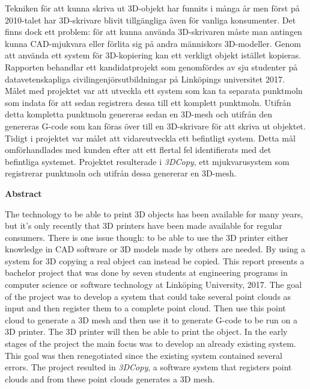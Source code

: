 \noindent
Tekniken för att kunna skriva ut 3D-objekt har funnits i många år men först på 2010-talet har 3D-skrivare blivit tillgängliga även för vanliga konsumenter. Det finns dock ett problem: för att kunna använda 3D-skrivaren måste man antingen kunna CAD-mjukvara eller förlita sig på andra människors 3D-modeller. Genom att använda ett system för 3D-kopiering kan ett verkligt objekt istället kopieras. Rapporten behandlar ett kandidatprojekt som genomfördes av sju studenter på datavetenskapliga civilingenjörsutbildningar på Linköpings universitet 2017. Målet med projektet var att utveckla ett system som kan ta separata punktmoln som indata för att sedan registrera dessa till ett komplett punktmoln. Utifrån detta kompletta punktmoln genereras sedan en 3D-mesh och utifrån den genereras G-code som kan föras över till en 3D-skrivare för att skriva ut objektet. Tidigt i projektet var målet att vidareutveckla ett befintligt system. Detta mål omförhandlades med kunden efter att ett flertal fel identifierats med det befintliga systemet. Projektet resulterade i \textit{3DCopy}, ett mjukvarusystem som registrerar punktmoln och utifrån dessa genererar en 3D-mesh.
\bigskip

\begin{center}
\textbf{Abstract}
\end{center}
\noindent

The technology to be able to print 3D objects has been available for many years, but it's only recently that 3D printers have been made available for regular consumers. There is one issue though: to be able to use the 3D printer either knowledge in CAD software or 3D models made by others are needed. By using a system for 3D copying a real object can instead be copied. This report presents a bachelor project that was done by seven students at engineering programs in computer science or software technology at Linköping University, 2017. The goal of the project was to develop a system that could take several point clouds as input and then register them to a complete point cloud. Then use this point cloud to generate a 3D mesh and then use it to generate G-code to be run on a 3D printer. The 3D printer will then be able to print the object. In the early stages of the project the main focus was to develop an already existing system. This goal was then renegotiated since the existing system contained several errors. The project resulted in \textit{3DCopy}, a software system that registers point clouds and from these point clouds generates a 3D mesh.

